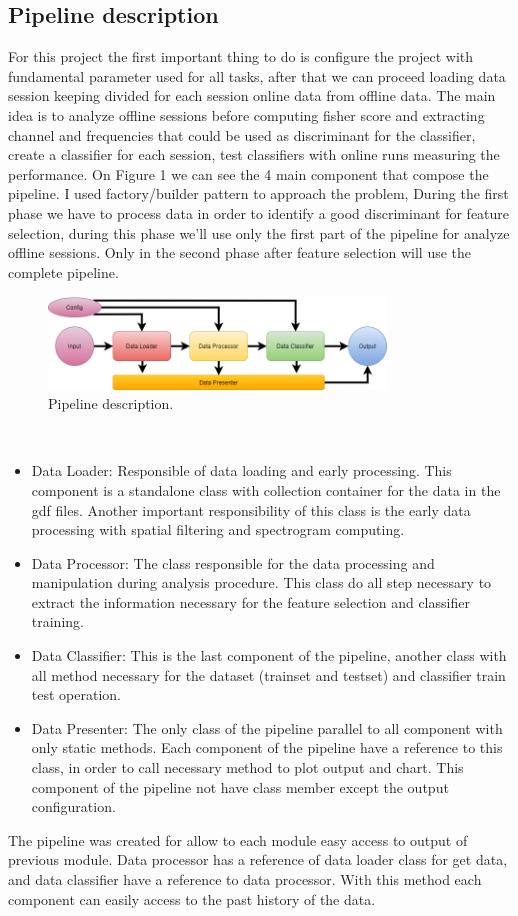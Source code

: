 \subsection{Pipeline description}\label{subsec:pipeline}
For this project the first important thing to do is configure the project with fundamental parameter used for all tasks, after that we can proceed loading data session keeping divided for each session online data from offline data. The main idea is to analyze offline sessions before computing fisher score and extracting channel and frequencies that could be used as discriminant for the classifier, create a classifier for each session, test classifiers with online runs measuring the performance. On Figure 1 we can see the 4 main component that compose the pipeline. I used factory/builder pattern to approach the problem, During the first phase we have to process data in order to identify a good discriminant for feature selection, during this phase we'll use only the first part of the pipeline for analyze offline sessions. Only in the second phase after feature selection will use the complete pipeline. 
\begin{figure}[h]
    \centering
    \includegraphics[width=0.8\textwidth]{Figure/NR_Pipeline.png}
    \caption{Pipeline description.}
    \label{fig:Pipeline}
\end{figure}\\
\begin{itemize}
    \item Data Loader: Responsible of data loading and early processing. This component is a standalone class with collection container for the data in the gdf files. Another important responsibility of this class is the early data processing with spatial filtering and spectrogram computing.
    \item Data Processor: The class responsible for the data processing and manipulation during analysis procedure. This class do all step necessary to extract the information necessary for the feature selection and classifier training. 
    \item Data Classifier: This is the last component of the pipeline, another class with all method necessary for the dataset (trainset and testset) and classifier train test operation.
    \item Data Presenter: The only class of the pipeline parallel to all component with only static methods. Each component of the pipeline have a reference to this class, in order to call necessary method to plot output and chart. This component of the pipeline not have class member except the output configuration.
\end{itemize}
The pipeline was created for allow to each module easy access to output of previous module. Data processor has a reference of data loader class for get data, and data classifier have a reference to data processor. With this method each component can easily access to the past history of the data.

